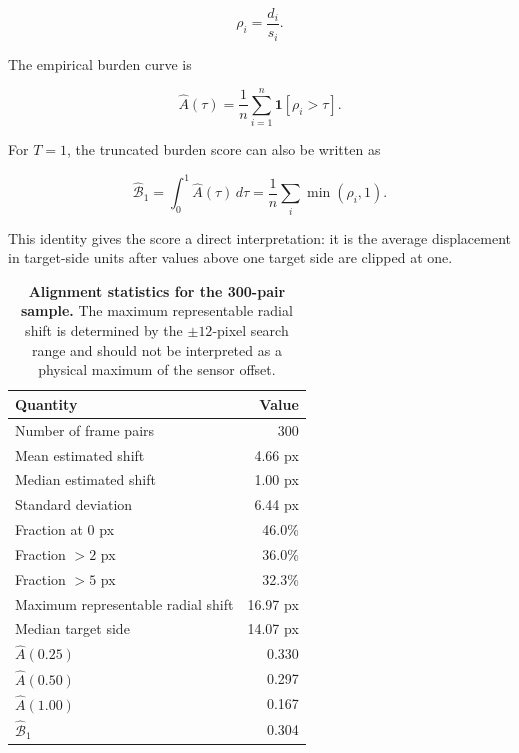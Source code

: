 \documentclass[10pt]{article}
\begin{document}
\begin{equation}
\rho_i=\frac{d_i}{s_i}.
\end{equation}

The empirical burden curve is

\begin{equation}
\widehat A(\tau)
=
\frac{1}{n}
\sum_{i=1}^{n}
\mathbf{1}[\rho_i>\tau].
\end{equation}

For $T=1$, the truncated burden score can also be written as

\begin{equation}
\widehat{\mathcal B}_{1}
=
\int_0^1
\widehat A(\tau)\,d\tau
=
\frac{1}{n}
\sum_i
\min(\rho_i,1).
\end{equation}

This identity gives the score a direct interpretation: it is the average displacement in target-side units after values above one target side are clipped at one.

\begin{table}[h]
\centering
\caption{\textbf{Alignment statistics for the 300-pair sample.}
The maximum representable radial shift is determined by the $\pm12$-pixel search range and should not be interpreted as a physical maximum of the sensor offset.}
\label{tab:alignsummary}
\small
\begin{tabular}{lr}
\toprule
Quantity & Value \\
\midrule
Number of frame pairs & 300 \\
Mean estimated shift & 4.66 px \\
Median estimated shift & 1.00 px \\
Standard deviation & 6.44 px \\
Fraction at 0 px & 46.0\% \\
Fraction $>2$ px & 36.0\% \\
Fraction $>5$ px & 32.3\% \\
Maximum representable radial shift & 16.97 px \\
Median target side & 14.07 px \\
$\widehat A(0.25)$ & 0.330 \\
$\widehat A(0.50)$ & 0.297 \\
$\widehat A(1.00)$ & 0.167 \\
$\widehat{\mathcal B}_{1}$ & 0.304 \\
\bottomrule
\end{tabular}
\end{table}
\end{document}
